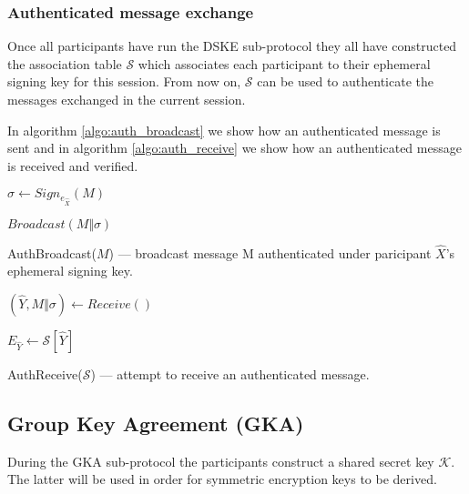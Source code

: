 \clearpage

\subsubsection{Authenticated message exchange}
Once all participants have run the DSKE sub-protocol they all have constructed the association table $\mathcal{S}$ which associates each participant to their ephemeral signing key for this session. From now on, $\mathcal{S}$ can be used to authenticate the messages exchanged in the current session.

In algorithm \ref{algo:auth_broadcast} we show how an authenticated message is sent and in algorithm \ref{algo:auth_receive} we show how an authenticated message is received and verified.

\begin{algorithm}[H]
  \Begin
  {		
	$\sigma \leftarrow Sign_{e_{\hat{X}}}(M)$
	
	$Broadcast(M \Vert \sigma)$
  }
  \caption{AuthBroadcast($M$) --- broadcast message M authenticated under paricipant $\hat{X}$'s ephemeral signing key.}
  \label{algo:auth_broadcast}
\end{algorithm}

\begin{algorithm}[H]
  \Begin
  {	
    $(\hat{Y}, M \Vert \sigma) \leftarrow Receive()$  
  
    $E_{\hat{Y}} \leftarrow \mathcal{S}[\hat{Y}]$
  
    {
    }  
  
  }
  \caption{AuthReceive($\mathcal{S}$) --- attempt to receive an authenticated message.}
  \label{algo:auth_receive}
\end{algorithm}

\subsection{Group Key Agreement (GKA)}
\label{subsections:gka}

During the GKA sub-protocol the participants construct a shared secret key $\mathcal{K}$. The latter will be used in order for symmetric encryption keys to be derived.

